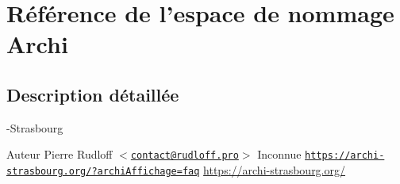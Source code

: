 \hypertarget{namespaceArchi}{\section{\-Référence de l'espace de nommage \-Archi}
\label{namespaceArchi}
}


\subsection{\-Description détaillée}
-\/\-Strasbourg \begin{DoxyAuthor}{\-Auteur}
\-Pierre \-Rudloff $<$\href{mailto:contact@rudloff.pro}{\tt contact@rudloff.\-pro}$>$  \-Inconnue \href{https://archi-strasbourg.org/?archiAffichage=faq}{\tt https\-://archi-\/strasbourg.\-org/?archi\-Affichage=faq} \hyperlink{}{https\-://archi-\/strasbourg.\-org/}
\end{DoxyAuthor}
